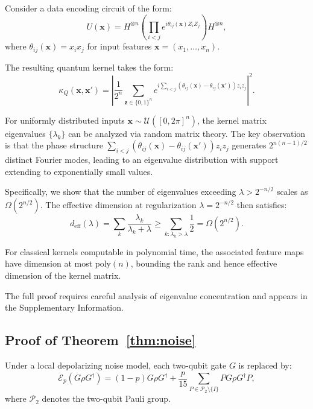 \documentclass[aps,prb,reprint,superscriptaddress,showpacs]{revtex4-2}
\begin{document}
Consider a data encoding circuit of the form:
\begin{equation}
    U(\mathbf{x}) = H^{\otimes n} \left(\prod_{i<j} e^{i \theta_{ij}(\mathbf{x}) Z_i Z_j}\right) H^{\otimes n},
\end{equation}
where $\theta_{ij}(\mathbf{x}) = x_i x_j$ for input features $\mathbf{x} = (x_1, \ldots, x_n)$.

The resulting quantum kernel takes the form:
\begin{equation}
    \kappa_Q(\mathbf{x}, \mathbf{x}') = \left|\frac{1}{2^n} \sum_{\mathbf{z} \in \{0,1\}^n} e^{i \sum_{i<j} (\theta_{ij}(\mathbf{x}) - \theta_{ij}(\mathbf{x}')) z_i z_j}\right|^2.
\end{equation}

For uniformly distributed inputs $\mathbf{x} \sim \mathcal{U}([0, 2\pi]^n)$, the kernel matrix eigenvalues $\{\lambda_k\}$ can be analyzed via random matrix theory. The key observation is that the phase structure $\sum_{i<j} (\theta_{ij}(\mathbf{x}) - \theta_{ij}(\mathbf{x}')) z_i z_j$ generates $2^{n(n-1)/2}$ distinct Fourier modes, leading to an eigenvalue distribution with support extending to exponentially small values.

Specifically, we show that the number of eigenvalues exceeding $\lambda > 2^{-n/2}$ scales as $\Omega(2^{n/2})$. The effective dimension at regularization $\lambda = 2^{-n/2}$ then satisfies:
\begin{equation}
    d_{\text{eff}}(\lambda) = \sum_k \frac{\lambda_k}{\lambda_k + \lambda} \geq \sum_{k: \lambda_k > \lambda} \frac{1}{2} = \Omega(2^{n/2}).
\end{equation}

For classical kernels computable in polynomial time, the associated feature maps have dimension at most $\text{poly}(n)$, bounding the rank and hence effective dimension of the kernel matrix.

The full proof requires careful analysis of eigenvalue concentration and appears in the Supplementary Information.


\subsection{Proof of Theorem~\ref{thm:noise}}

Under a local depolarizing noise model, each two-qubit gate $G$ is replaced by:
\begin{equation}
    \mathcal{E}_p(G \rho G^\dagger) = (1-p) G \rho G^\dagger + \frac{p}{15} \sum_{P \in \mathcal{P}_2 \setminus \{I\}} P G \rho G^\dagger P,
\end{equation}
where $\mathcal{P}_2$ denotes the two-qubit Pauli group.
\end{document}
